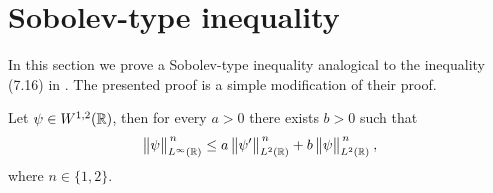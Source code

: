 \section{Sobolev-type inequality}
\label{apdx-sobolev-ineq}

In this section we prove a Sobolev-type inequality analogical to the inequality (7.16) in \cite{BEH}. The presented proof is a simple modification of their proof.
\begin{lemma}
	Let $\psi \in W^{1,2}(\mathbb{R})$, then for every $a>0$ there exists $b>0$ such that
	\begin{equation}
		\big\lVert \psi \big\rVert^{\,n}_{L^\infty(\mathbb{R})}
		\leq
		a \, \big\lVert \psi' \big\rVert^{\,n}_{L^2(\mathbb{R})} +
		b \, \big\lVert \psi \big\rVert^{\,n}_{L^2(\mathbb{R})}
		\: ,
		\label{sobolev-type-0}
	\end{equation}
	where $n \in \{ 1, 2 \}$.
	\label{lemma-sobolev-type-inequality}
\end{lemma}
